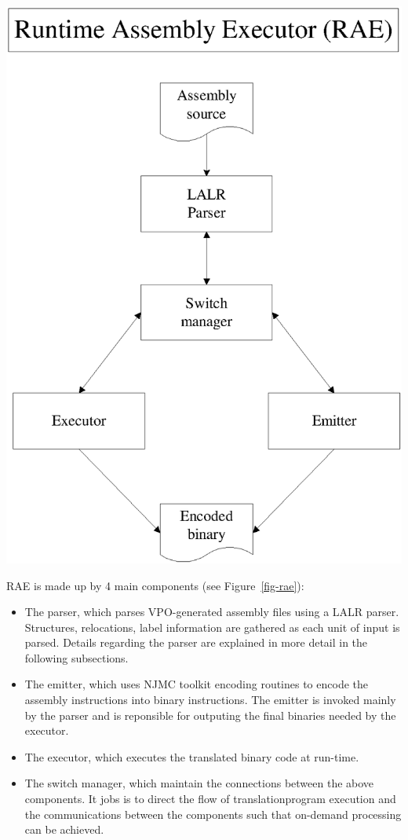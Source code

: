 \centerfigbegin
\resizebox{!}{8cm}
{\includegraphics{figures/rae.eps}}

RAE is made up by 4 main components (see Figure~\ref{fig-rae}):  

\begin{itemize} 
\item 	The parser, 
		which parses VPO-generated assembly files using a LALR parser. 
		Structures, relocations, label information are gathered as each unit 
		of input is parsed.  Details regarding the parser are
		explained in more detail in the following subsections. 

\item 	The emitter, which uses NJMC toolkit encoding routines to encode the
		assembly instructions into binary instructions.  The emitter is invoked
		mainly by the parser and is reponsible for outputing the final binaries
		needed by the executor. 

\item 	The executor, which executes the translated binary code at run-time. 
	
\item 	The switch manager, which maintain the connections between the above
		components.  It jobs is to direct the flow of translation\/program 
		execution and the communications between the components such that 
		on-demand processing can be achieved.  
\end{itemize}

